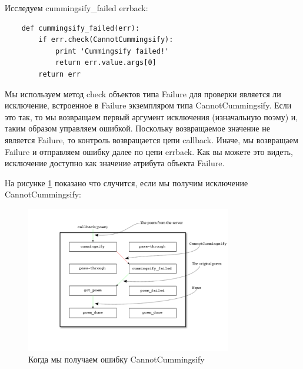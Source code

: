 Исследуем cummingsify\_failed errback:

\begin{scriptsize}\begin{verbatim}
    def cummingsify_failed(err):
        if err.check(CannotCummingsify):
            print 'Cummingsify failed!'
            return err.value.args[0]
        return err
\end{verbatim}\end{scriptsize}


Мы используем метод check объектов типа Failure для проверки 
является ли исключение, встроенное в Failure экземпляром 
типа CannotCummingsify. Если это так, то мы возвращаем 
первый аргумент исключения (изначальную поэму) и, таким 
образом управляем ошибкой. Поскольку возвращаемое значение 
не является Failure, то контроль возвращается цепи callback. 
Иначе, мы возвращаем Failure и отправляем ошибку далее по 
цепи errback. Как вы можете это видеть, исключение доступно 
как значение атрибута объекта Failure.   


На рисунке \ref{fig:deferred-10} показано что случится, 
если мы получим исключение CannotCummingsify:

\begin{figure}[h]
\begin{center}
    \includegraphics[width=0.8\textwidth]{images/deferred-10.pdf}
    \caption{Когда мы получаем ошибку CannotCummingsify\label{fig:deferred-10}}
\end{center}
\end{figure}

